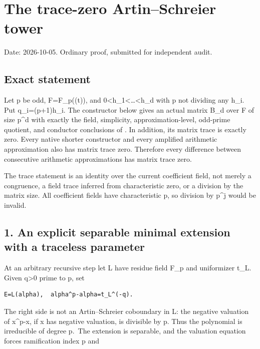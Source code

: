 \clearpage
\section{The trace-zero Artin--Schreier tower}\label{app:odd_tower}

Date: 2026-10-05. Ordinary proof, submitted for independent audit.

\hypertarget{odd_tower-exact-statement}{%
\subsection{Exact statement}\label{odd_tower-exact-statement}}

Let p be odd, F=F\_p((t)), and
0\textless h\_1\textless\ldots\textless h\_d with p not dividing any
h\_i. Put q\_i=(p+1)h\_i. The constructor below gives an actual matrix
B\_d over F of size p\^{}d with exactly the field, simplicity,
approximation-level, odd-prime quotient, and conductor conclusions of
. In addition, its matrix trace is exactly zero.
Every native shorter constructor and every amplified arithmetic
approximation also has matrix trace zero. Therefore every difference
between consecutive arithmetic approximations has matrix trace zero.

The trace statement is an identity over the current coefficient field,
not merely a congruence, a field trace inferred from characteristic
zero, or a division by the matrix size. All coefficient fields have
characteristic p, so division by p\^{}j would be invalid.

\hypertarget{odd_tower-an-explicit-separable-minimal-extension-with-a-traceless-parameter}{%
\subsection{1. An explicit separable minimal extension with a traceless
parameter}\label{odd_tower-an-explicit-separable-minimal-extension-with-a-traceless-parameter}}

At an arbitrary recursive step let L have residue field F\_p and
uniformizer t\_L. Given q\textgreater0 prime to p, set

\begin{Verbatim}[fontsize=\small,breaklines=true,breakanywhere=true]
E=L(alpha),  alpha^p-alpha=t_L^(-q).
\end{Verbatim}

The right side is not an Artin--Schreier coboundary in L: the negative
valuation of x\^{}p-x, if x has negative valuation, is divisible by p.
Thus the polynomial is irreducible of degree p.~The extension is
separable, and the valuation equation forces ramification index p and

